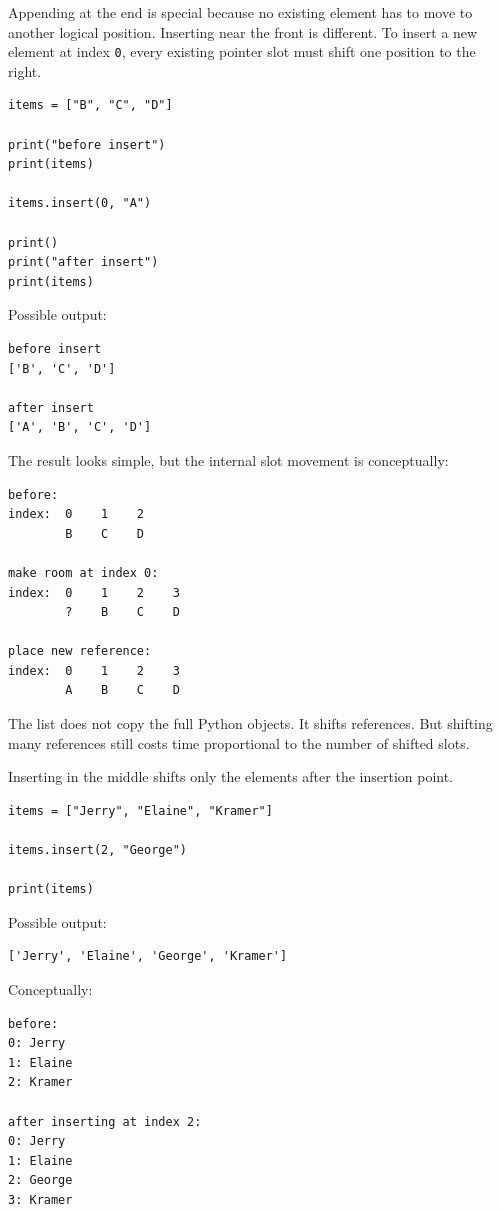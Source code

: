 Appending at the end is special because no existing element has to move to another logical position. Inserting near the front is different. To insert a new element at index \texttt{0}, every existing pointer slot must shift one position to the right.

\begin{verbatim}
items = ["B", "C", "D"]

print("before insert")
print(items)

items.insert(0, "A")

print()
print("after insert")
print(items)
\end{verbatim}

Possible output:

\begin{verbatim}
before insert
['B', 'C', 'D']

after insert
['A', 'B', 'C', 'D']
\end{verbatim}

The result looks simple, but the internal slot movement is conceptually:

\begin{verbatim}
before:
index:  0    1    2
        B    C    D

make room at index 0:
index:  0    1    2    3
        ?    B    C    D

place new reference:
index:  0    1    2    3
        A    B    C    D
\end{verbatim}

The list does not copy the full Python objects. It shifts references. But shifting many references still costs time proportional to the number of shifted slots.

Inserting in the middle shifts only the elements after the insertion point.

\begin{verbatim}
items = ["Jerry", "Elaine", "Kramer"]

items.insert(2, "George")

print(items)
\end{verbatim}

Possible output:

\begin{verbatim}
['Jerry', 'Elaine', 'George', 'Kramer']
\end{verbatim}

Conceptually:

\begin{verbatim}
before:
0: Jerry
1: Elaine
2: Kramer

after inserting at index 2:
0: Jerry
1: Elaine
2: George
3: Kramer
\end{verbatim}

